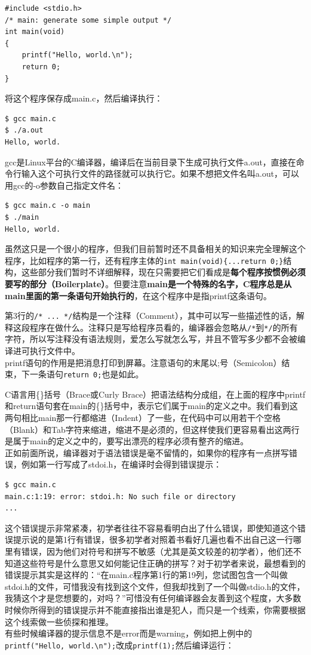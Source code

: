 \documentclass[12pt]{book}
\begin{document}
\begin{verbatim}
#include <stdio.h>
/* main: generate some simple output */
int main(void)
{
	printf("Hello, world.\n");
	return 0;
}
\end{verbatim}
将这个程序保存成main.c，然后编译执行：
\begin{verbatim}
$ gcc main.c
$ ./a.out
Hello, world.
\end{verbatim}

gcc是Linux平台的C编译器，编译后在当前目录下生成可执行文件a.out，直接在命令行输入这个可执行文件的路径就可以执行它。如果不想把文件名叫a.out，可以用gcc的-o参数自己指定文件名：

\begin{verbatim}
$ gcc main.c -o main
$ ./main
Hello, world.
\end{verbatim}

虽然这只是一个很小的程序，但我们目前暂时还不具备相关的知识来完全理解这个程序，比如程序的第一行，还有程序主体的\texttt{int\ main(void)\{...return\ 0;\}}结构，这些部分我们暂时不详细解释，现在只需要把它们看成是\textbf{每个程序按惯例必须要写的部分（Boilerplate）}。但要注意\textbf{main是一个特殊的名字，C程序总是从main里面的第一条语句开始执行的}，在这个程序中是指printf这条语句。

第3行的\texttt{/*\ ...\ */}结构是一个注释（Comment），其中可以写一些描述性的话，解释这段程序在做什么。注释只是写给程序员看的，编译器会忽略从\texttt{/*}到\texttt{*/}的所有字符，所以写注释没有语法规则，爱怎么写就怎么写，并且不管写多少都不会被编译进可执行文件中。\\
printf语句的作用是把消息打印到屏幕。注意语句的末尾以;号（Semicolon）结束，下一条语句\texttt{return\ 0;}也是如此。

C语言用\{\}括号（Brace或Curly
Brace）把语法结构分成组，在上面的程序中printf和return语句套在main的\{\}括号中，表示它们属于main的定义之中。我们看到这两句相比main那一行都缩进（Indent）了一些，在代码中可以用若干个空格（Blank）和Tab字符来缩进，缩进不是必须的，但这样使我们更容易看出这两行是属于main的定义之中的，要写出漂亮的程序必须有整齐的缩进。\\
正如前面所说，编译器对于语法错误是毫不留情的，如果你的程序有一点拼写错误，例如第一行写成了stdoi.h，在编译时会得到错误提示：

\begin{verbatim}
$ gcc main.c
main.c:1:19: error: stdoi.h: No such file or directory
...
\end{verbatim}

这个错误提示非常紧凑，初学者往往不容易看明白出了什么错误，即使知道这个错误提示说的是第1行有错误，很多初学者对照着书看好几遍也看不出自己这一行哪里有错误，因为他们对符号和拼写不敏感（尤其是英文较差的初学者），他们还不知道这些符号是什么意思又如何能记住正确的拼写？对于初学者来说，最想看到的错误提示其实是这样的：``在main.c程序第1行的第19列，您试图包含一个叫做stdoi.h的文件，可惜我没有找到这个文件，但我却找到了一个叫做stdio.h的文件，我猜这个才是您想要的，对吗？''可惜没有任何编译器会友善到这个程度，大多数时候你所得到的错误提示并不能直接指出谁是犯人，而只是一个线索，你需要根据这个线索做一些侦探和推理。\\
有些时候编译器的提示信息不是error而是warning，例如把上例中的\texttt{printf("Hello,\ world.\textbackslash{}n");}改成\texttt{printf(1);}然后编译运行：
\end{document}
